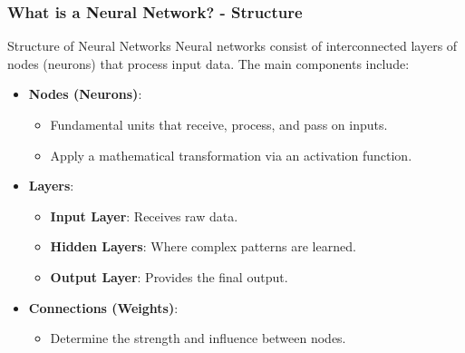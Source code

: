 \documentclass[aspectratio=169]{beamer}
\begin{document}
\begin{frame}[fragile]
    \frametitle{What is a Neural Network? - Structure}
    \begin{block}{Structure of Neural Networks}
        Neural networks consist of interconnected layers of nodes (neurons) that process input data. The main components include:
        \begin{itemize}
            \item \textbf{Nodes (Neurons)}: 
            \begin{itemize}
                \item Fundamental units that receive, process, and pass on inputs.
                \item Apply a mathematical transformation via an activation function.
            \end{itemize}
            \item \textbf{Layers}:
            \begin{itemize}
                \item \textbf{Input Layer}: Receives raw data.
                \item \textbf{Hidden Layers}: Where complex patterns are learned.
                \item \textbf{Output Layer}: Provides the final output.
            \end{itemize}
            \item \textbf{Connections (Weights)}: 
            \begin{itemize}
                \item Determine the strength and influence between nodes.
            \end{itemize}
        \end{itemize}
    \end{block}
\end{frame}
\end{document}
